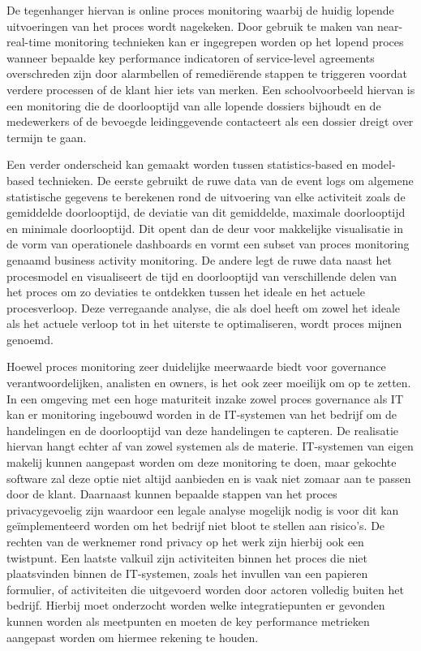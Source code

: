De tegenhanger hiervan is online proces monitoring waarbij de huidig lopende uitvoeringen van het proces wordt nagekeken. Door gebruik te maken van near-real-time monitoring technieken kan er ingegrepen worden op het lopend proces wanneer bepaalde key performance indicatoren of service-level agreements overschreden zijn door alarmbellen of remediërende stappen te triggeren voordat verdere processen of de klant hier iets van merken. Een schoolvoorbeeld hiervan is een monitoring die de doorlooptijd van alle lopende dossiers bijhoudt en de medewerkers of de bevoegde leidinggevende contacteert als een dossier dreigt over termijn te gaan. \newline

Een verder onderscheid kan gemaakt worden tussen statistics-based en model-based technieken. De eerste gebruikt de ruwe data van de event logs om algemene statistische gegevens te berekenen rond de uitvoering van elke activiteit zoals de gemiddelde doorlooptijd, de deviatie van dit gemiddelde, maximale doorlooptijd en minimale doorlooptijd. Dit opent dan de deur voor makkelijke visualisatie in de vorm van operationele dashboards en vormt een subset van proces monitoring genaamd business activity monitoring. De andere legt de ruwe data naast het procesmodel en visualiseert de tijd en doorlooptijd van verschillende delen van het proces om zo deviaties te ontdekken tussen het ideale en het actuele procesverloop. Deze verregaande analyse, die als doel heeft om zowel het ideale als het actuele verloop tot in het uiterste te optimaliseren, wordt proces mijnen genoemd.\newline

Hoewel proces monitoring zeer duidelijke meerwaarde biedt voor governance verantwoordelijken, analisten en owners, is het ook zeer moeilijk om op te zetten. In een omgeving met een hoge maturiteit inzake zowel proces governance als IT kan er monitoring ingebouwd worden in de IT-systemen van het bedrijf om de handelingen en de doorlooptijd van deze handelingen te capteren. De realisatie hiervan hangt echter af van zowel systemen als de materie. IT-systemen van eigen makelij kunnen aangepast worden om deze monitoring te doen, maar gekochte software zal deze optie niet altijd aanbieden en is vaak niet zomaar aan te passen door de klant. Daarnaast kunnen bepaalde stappen van het proces privacygevoelig zijn waardoor een legale analyse mogelijk nodig is voor dit kan geïmplementeerd worden om het bedrijf niet bloot te stellen aan risico’s. De rechten van de werknemer rond privacy op het werk zijn hierbij ook een twistpunt. Een laatste valkuil zijn activiteiten binnen het proces die niet plaatsvinden binnen de IT-systemen, zoals het invullen van een papieren formulier, of activiteiten die uitgevoerd worden door actoren volledig buiten het bedrijf. Hierbij moet onderzocht worden welke integratiepunten er gevonden kunnen worden als meetpunten en moeten de key performance metrieken aangepast worden om hiermee rekening te houden.\newline

